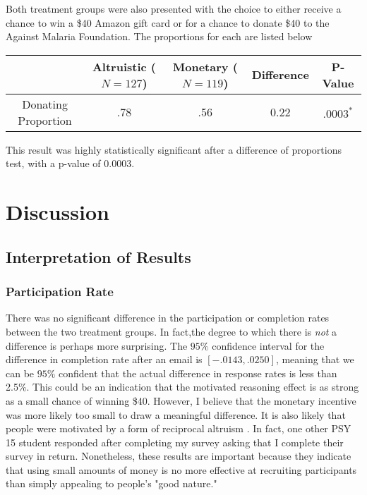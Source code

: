 \documentclass[12pt]{article}
\begin{document}
Both treatment groups were also presented with the choice to either receive a chance to win a \$40 Amazon gift card or for a chance to donate \$40 to the Against Malaria Foundation. The proportions for each are listed below

\begin{center}
    \begin{tabular}{c| c c | c c}
         & \parbox[t]{2cm}{\textbf{Altruistic}\\($N = 127$)} & \parbox[t]{2cm}{\textbf{Monetary}\\($N = 119$)} & \textbf{Difference} & \textbf{P-Value}\\
         \hline
         Donating Proportion & .78 & .56 & 0.22 &  $.0003^{*}$
    \end{tabular}
\end{center}
This result was highly statistically significant after a difference of proportions test, with a p-value of 0.0003. 

\section{Discussion}
\subsection{Interpretation of Results}
\subsubsection{Participation Rate}
There was no significant difference in the participation or completion rates between the two treatment groups. In fact,the degree to which there is \textit{not} a difference is perhaps more surprising. The $95\%$ confidence interval for the difference in completion rate after an email is $[-.0143,.0250]$, meaning that we can be $95\%$ confident that the actual difference in response rates is less than 2.5\%. This could be an indication that the motivated reasoning effect is as strong as a small chance of winning \$40. However, I believe that the monetary incentive was more likely too small to draw a meaningful difference. It is also likely that people were motivated by a form of reciprocal altruism \citep{trivers}. In fact, one other PSY 15 student responded after completing my survey asking that I complete their survey in return. Nonetheless, these results are important because they indicate that using small amounts of money is no more effective at recruiting participants than simply appealing to people's "good nature."
\end{document}

